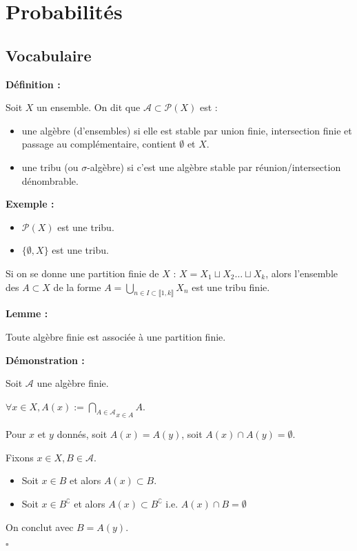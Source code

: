 \documentclass[10pt,a4paper,notitlepage ]{report}
\newcommand{\1}{\mathds 1}
\newcommand{\comp}[1]{#1^\complement}
\newenvironment{definition}[1][]{
	
	\textbf{Définition #1 : }
}
{}
\newcounter{th}
\newenvironment{demo}[1][]{

	\textbf{Démonstration #1 :}
}{\begin{flushright}
	$\square$
\end{flushright}
}
\newenvironment{exemple}{
	
	\textbf{Exemple :} }{}
\newenvironment{lemme}[1][]{
	\begin{tcolorbox}
		\textbf{Lemme #1 : }
	}
	{\end{tcolorbox}}
\begin{document}
\chapter{Probabilités}
\section{Vocabulaire}

\begin{definition}
	Soit $X$ un ensemble. On dit que $\mathcal A \subset \mathcal P(X)$ est :
	\begin{itemize}
		\item une algèbre (d'ensembles) si elle est stable par union finie, intersection finie et passage au complémentaire, contient $\emptyset$ et $X$.
		\item une tribu (ou $\sigma$-algèbre) si c'est une algèbre stable par réunion/intersection dénombrable.
	\end{itemize}
\end{definition}

\begin{exemple}
	\begin{itemize}
		\item $\mathcal P(X)$ est une tribu.
		\item $\{\emptyset, X\}$ est une tribu.
	\end{itemize}
\end{exemple}

Si on se donne une partition finie de $X$ : $X=X_1 \sqcup X_2 \dots \sqcup X_k$, alors l'ensemble des $A \subset X$ de la forme $A=\underset{n\in I \subset \llbracket 1,k \rrbracket}{\bigcup}X_n$ est une tribu finie.

\begin{lemme}
	Toute algèbre finie est associée à une partition finie.
\end{lemme}

\begin{demo}
	Soit $\mathcal A$ une algèbre finie.
	
	$\forall x \in X, A(x) := \underset{x\in A}{\underset{A\in \mathcal A}{\bigcap}} A$.
	
	Pour $x$ et $y$ donnés, soit $A(x) = A(y)$, soit $A(x) \cap A(y) = \emptyset$.
	
	Fixons $x\in X, B\in\mathcal A$.
	\begin{itemize}
		\item Soit $x\in B$ et alors $A(x)\subset B$.
		\item Soit $x\in \comp B$ et alors $A(x)\subset \comp B$ i.e. $A(x)\cap B = \emptyset$
	\end{itemize}
	On conclut avec $B=A(y)$.
\end{demo}
\end{document}
